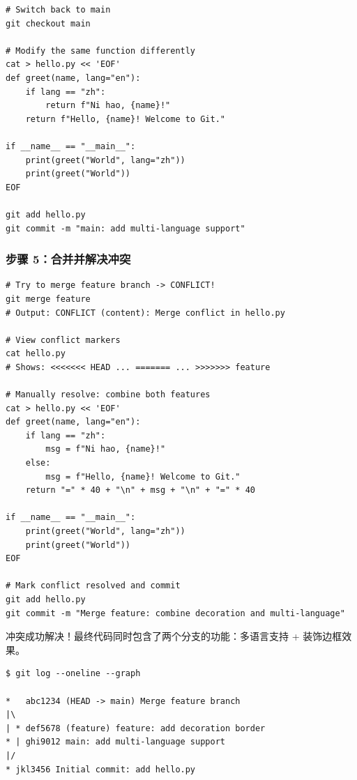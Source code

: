 \documentclass[12pt,a4paper]{article}
\begin{document}
\begin{lstlisting}[style=gitstyle, caption={Modify same location on main}]
# Switch back to main
git checkout main

# Modify the same function differently
cat > hello.py << 'EOF'
def greet(name, lang="en"):
    if lang == "zh":
        return f"Ni hao, {name}!"
    return f"Hello, {name}! Welcome to Git."

if __name__ == "__main__":
    print(greet("World", lang="zh"))
    print(greet("World"))
EOF

git add hello.py
git commit -m "main: add multi-language support"
\end{lstlisting}

\subsubsection{步骤 5：合并并解决冲突}

\begin{lstlisting}[style=gitstyle, caption={Merge and resolve conflict}]
# Try to merge feature branch -> CONFLICT!
git merge feature
# Output: CONFLICT (content): Merge conflict in hello.py

# View conflict markers
cat hello.py
# Shows: <<<<<<< HEAD ... ======= ... >>>>>>> feature

# Manually resolve: combine both features
cat > hello.py << 'EOF'
def greet(name, lang="en"):
    if lang == "zh":
        msg = f"Ni hao, {name}!"
    else:
        msg = f"Hello, {name}! Welcome to Git."
    return "=" * 40 + "\n" + msg + "\n" + "=" * 40

if __name__ == "__main__":
    print(greet("World", lang="zh"))
    print(greet("World"))
EOF

# Mark conflict resolved and commit
git add hello.py
git commit -m "Merge feature: combine decoration and multi-language"
\end{lstlisting}

\begin{resultbox}
冲突成功解决！最终代码同时包含了两个分支的功能：多语言支持 + 装饰边框效果。
\end{resultbox}

\begin{lstlisting}[style=gitstyle, caption={View merge history}]
$ git log --oneline --graph

*   abc1234 (HEAD -> main) Merge feature branch
|\
| * def5678 (feature) feature: add decoration border
* | ghi9012 main: add multi-language support
|/
* jkl3456 Initial commit: add hello.py
\end{lstlisting}
\end{document}

